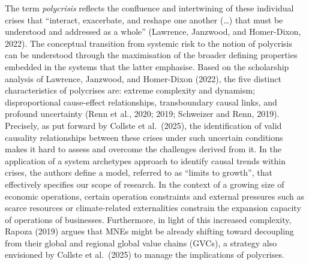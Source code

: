 \documentclass[12pt,a4paper]{article}
\begin{document}
The term \textit{polycrisis} reflects the confluence and intertwining of these individual crises that ``interact, exacerbate, and reshape one another (\ldots) that must be understood and addressed as a whole'' (Lawrence, Janzwood, and Homer-Dixon, 2022). The conceptual transition from systemic risk to the notion of polycrisis can be understood through the maximisation of the broader defining properties embedded in the systems that the latter emphasise. Based on the scholarship analysis of Lawrence, Janzwood, and Homer-Dixon (2022), the five distinct characteristics of polycrises are: extreme complexity and dynamism; disproportional cause-effect relationships, transboundary causal links, and profound uncertainty (Renn et al., 2020; 2019; Schweizer and Renn, 2019). Precisely, as put forward by Collste et al.\ (2025), the identification of valid causality relationships between these crises under such uncertain conditions makes it hard to assess and overcome the challenges derived from it. In the application of a system archetypes approach to identify causal trends within crises, the authors define a model, referred to as ``limits to growth'', that effectively specifies our scope of research. In the context of a growing size of economic operations, certain operation constraints and external pressures such as scarce resources or climate-related externalities constrain the expansion capacity of operations of businesses. Furthermore, in light of this increased complexity, Rapoza (2019) argues that MNEs might be already shifting toward decoupling from their global and regional global value chains (GVCs), a strategy also envisioned by Collste et al.\ (2025) to manage the implications of polycrises.
\end{document}
